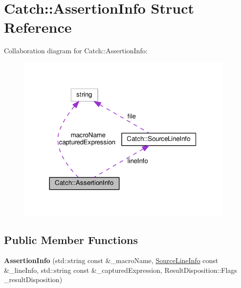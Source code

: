 \hypertarget{structCatch_1_1AssertionInfo}{}\section{Catch\+:\+:Assertion\+Info Struct Reference}
\label{structCatch_1_1AssertionInfo}


Collaboration diagram for Catch\+:\+:Assertion\+Info\+:
\nopagebreak
\begin{figure}[H]
\begin{center}
\leavevmode
\includegraphics[width=305pt]{structCatch_1_1AssertionInfo__coll__graph}
\end{center}
\end{figure}
\subsection*{Public Member Functions}
\begin{DoxyCompactItemize}
\item 
{\bfseries Assertion\+Info} (std\+::string const \&\+\_\+macro\+Name, \hyperlink{structCatch_1_1SourceLineInfo}{Source\+Line\+Info} const \&\+\_\+line\+Info, std\+::string const \&\+\_\+captured\+Expression, Result\+Disposition\+::\+Flags \+\_\+result\+Disposition)\hypertarget{structCatch_1_1AssertionInfo_aaf6cc3eebd40391e54d37ed42953c73f}{}\label{structCatch_1_1AssertionInfo_aaf6cc3eebd40391e54d37ed42953c73f}

\end{DoxyCompactItemize}
